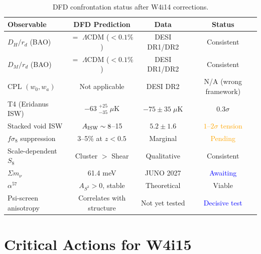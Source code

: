 \documentclass[11pt,a4paper]{article}
\newcommand{\LCDM}{$\Lambda$CDM}
\begin{document}
\begin{table}[H]
\centering
\caption{DFD confrontation status after W4i14 corrections.}
\label{tab:status}
\small
\begin{tabular}{lccc}
\toprule
\textbf{Observable} & \textbf{DFD Prediction} &
\textbf{Data} & \textbf{Status} \\
\midrule
$D_H/r_d$ (BAO) & $=$ \LCDM{} ($< 0.1\%$) &
  DESI DR1/DR2 & \textcolor{green!60!black}{Consistent} \\
$D_M/r_d$ (BAO) & $=$ \LCDM{} ($< 0.1\%$) &
  DESI DR1/DR2 & \textcolor{green!60!black}{Consistent} \\
CPL $(w_0, w_a)$ & Not applicable &
  DESI DR2 & N/A (wrong framework) \\
T4 (Eridanus ISW) & $-63\;{}^{+25}_{-35}\;\mu$K &
  $-75 \pm 35\;\mu$K & \textcolor{green!60!black}{$0.3\sigma$} \\
Stacked void ISW & $A_{\rm ISW} \sim 8$--15 &
  $5.2 \pm 1.6$ & \textcolor{orange}{$1$--$2\sigma$ tension} \\
$f\sigma_8$ suppression & 3--5\% at $z < 0.5$ &
  Marginal & \textcolor{orange}{Pending} \\
Scale-dependent $S_8$ & Cluster $>$ Shear &
  Qualitative & \textcolor{green!60!black}{Consistent} \\
$\Sigma m_\nu$ & 61.4 meV &
  JUNO 2027 & \textcolor{blue}{Awaiting} \\
$\alpha^{57}$ & $A_{S^3} > 0$, stable &
  Theoretical & \textcolor{green!60!black}{Viable} \\
Psi-screen anisotropy & Correlates with structure &
  Not yet tested & \textcolor{blue}{Decisive test} \\
\bottomrule
\end{tabular}
\end{table}


\section{Critical Actions for W4i15}
\label{sec:actions}
\end{document}
